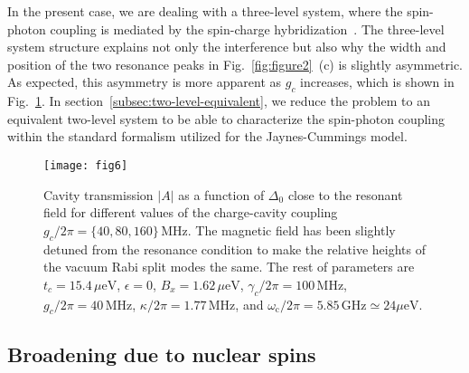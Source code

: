 \documentclass[twocolumn,english,aps,prl,preprint,reprint,showpacs,longbibliography,showkeys]{revtex4-1}
\begin{document}
In the present case, we are dealing with a three-level system, where the spin-photon coupling is mediated by the spin-charge hybridization~\cite{Childress2004}. 
 The three-level system structure explains not only the interference but also why the width and position of the two resonance peaks in Fig.~\ref{fig:figure2}~(c) is slightly asymmetric. As expected, this asymmetry is more apparent as $g_c$ increases, which is shown in Fig.~\ref{fig:figure6}.  In   section~\ref{subsec:two-level-equivalent}, we reduce the problem to an equivalent two-level system to be able to characterize the spin-photon coupling within the standard formalism utilized for the Jaynes-Cummings model.




\begin{figure}
\texttt{[image: fig6]}
\protect\caption{\label{fig:figure6}Cavity transmission $|A|$ as a function of $\Delta_0$ close to the resonant field for different values of the charge-cavity coupling  $g_c/2\pi=\{40,80,160\}\,\mathrm{MHz}$. The magnetic field has been slightly detuned from the resonance condition to make the relative heights of the vacuum Rabi split modes the same.  The rest of parameters are  $t_c=15.4\,\mu\mathrm{eV}$, $\epsilon=0$, $B_x=1.62\,\mu\mathrm{eV}$, $\gamma_c/2\pi=100\,\mathrm{MHz}$, $g_c/2\pi=40\,\mathrm{MHz}$, $\kappa/2\pi=1.77\,\mathrm{MHz}$, and $\omega_{\mathrm{c}}/2\pi=5.85\,\mathrm{GHz}\simeq 24\mu\mathrm{eV}$.}
\end{figure}



\subsection{Broadening due to nuclear spins}
\label{subsec:nuclear-spins}
\end{document}

